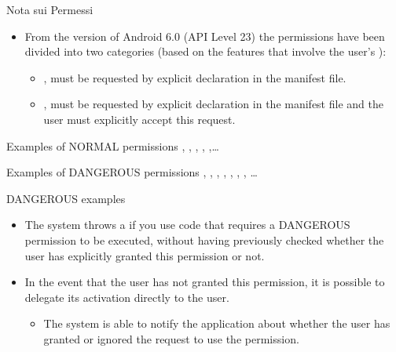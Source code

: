 \documentclass{beamer}
\begin{document}
  \begin{frame}{Nota sui Permessi}
    \begin{itemize}
      \item From the version of Android 6.0 (API Level 23) the permissions have
      been divided into two categories (based on the features that involve the
      user's ):
      \begin{itemize}
        \item {}, must be requested by explicit declaration in the
        manifest file. 
        \item {}, must be requested by explicit declaration in the
        manifest file and the user must explicitly accept this request. 
      \end{itemize}
    \end{itemize}
    \begin{block}{Examples of NORMAL permissions}
      , ,
      , , ,\dots
    \end{block}

    \begin{block}{Examples of DANGEROUS permissions}
    , , , , , , , \dots
    \end{block}
  \end{frame}

  \begin{frame}{DANGEROUS examples}
    \begin{itemize}\itemsep10pt
      \item The system throws a  if you use code that
      requires a DANGEROUS permission to be executed, without having previously
      checked whether the user has explicitly granted this permission or not.
      \item In the event that the user has not granted this permission, it is
      possible to delegate its activation directly to the user.
      \begin{itemize}
        \item The system is able to notify the application about whether the
        user has granted or ignored the request to use the permission.
      \end{itemize}
    \end{itemize}
    \vfill
  \end{frame}
\end{document}

